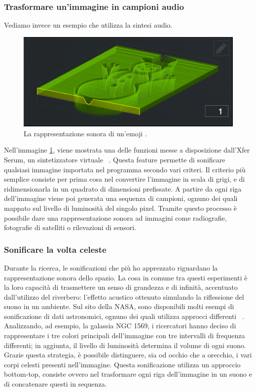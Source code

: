 \subsubsection{Trasformare un'immagine in campioni audio}
Vediamo invece un esempio che utilizza la sintesi audio.
\begin{figure}[H]
  \includegraphics[width=\linewidth]{img/snowman.png}
  \caption{La rappresentazione sonora di un'emoji \cite{snowman}.}
  \label{fig:emoji_wavetable}
\end{figure}

Nell'immagine \ref{fig:emoji_wavetable}, viene mostrata una delle funzioni messe a disposizione dall'Xfer Serum, un sintetizzatore virtuale ~\cite{serum}.
Questa feature permette di sonificare qualsiasi immagine importata nel programma secondo vari criteri.
Il criterio più semplice consiste per prima cosa nel convertire l'immagine in scala di grigi, e di ridimensionarla in un quadrato di dimensioni prefissate.
A partire da ogni riga dell'immagine viene poi generata una sequenza di campioni, ognuno dei quali mappato sul livello di luminosità del singolo pixel.
Tramite questo processo è possibile dare una rappresentazione sonora ad immagini come radiografie, fotografie di satelliti o rilevazioni di sensori.

\subsubsection{Sonificare la volta celeste}
Durante la ricerca, le sonificazioni che più ho apprezzato riguardano la rappresentazione sonora dello spazio.
La cosa in comune tra questi esperimenti è la loro capacità di trasmettere un senso di grandezza e di infinità, accentuato dall'utilizzo del riverbero: l'effetto acustico ottenuto simulando la riflessione del suono in un ambiente. 
Sul sito della NASA, sono disponibili molti esempi di sonificazione di dati astronomici, ognuno dei quali utilizza approcci differenti ~\cite{nasa}.
Analizzando, ad esempio, la galassia NGC 1569, i ricercatori hanno deciso di rappresentare i tre colori principali dell'immagine con tre intervalli di frequenza differenti; in aggiunta, il livello di luminosità determina il volume di ogni suono.
Grazie questa strategia, è possibile distinguere, sia od occhio che a orecchio, i vari corpi celesti presenti nell'immagine.
Questa sonificazione utilizza un approccio bottom-top, consiste ovvero nel trasformare ogni riga dell'immagine in un suono e di concatenare questi in sequenza. 

